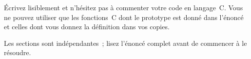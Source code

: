 \'Ecrivez lisiblement et n'h\'esitez pas \`a commenter votre code en
langage~C.  Vous ne pouvez utiliser que les fonctions~C dont le
prototype est donn\'e dans l'\'enonc\'e et celles dont vous donnez la
d\'efinition dans vos copies.
\par
Les sections sont ind\'ependantes~; lisez l'\'enonc\'e complet avant
de commencer \`a le r\'esoudre.


